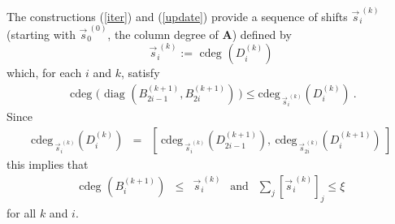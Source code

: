\documentclass[a4paper,11pt]{article}
\begin{document}
The constructions (\ref{iter}) and (\ref{update}) provide a sequence of shifts $\vec{s}_i^{~(k)}$ (starting with $\vec{s}_0^{~(0)}$, 
the column degree of $\mathbf{A}$) defined by 
$$
\vec{s}_i^{~(k)} := \mbox{ cdeg } ( D_i^{(k)} )
$$
which, for each $i$ and $k$, satisfy
\begin{eqnarray}
\mbox{ cdeg ( diag } ( B_{2i-1}^{(k+1)}, B_{2i}^{(k+1)} ) ~ )  \leq \mbox{cdeg}_{ ~ \vec{s}_i^{~(k)}} ( D_i^{(k)} ) ~. \nonumber
\end{eqnarray}
Since 
\begin{eqnarray}
\mbox{cdeg}_{ ~ \vec{s}_i^{~(k)}} ( D_i^{(k)} )
& = &  [ ~ \mbox{cdeg}_{ ~ \vec{s}_i^{~(k)}} ( D_{2i-1}^{(k+1)} ), ~\mbox{cdeg}_{ ~ \vec{s}_{2i}^{~(k)}} ( D_i^{(k+1)} ) ~] \nonumber
\end{eqnarray}
 this implies that 
\begin{eqnarray}
\mbox{ cdeg } ( B_i^{(k+1)} ) & \leq&  \vec{s}_i^{~(k)} ~~ \mbox{ and } ~~ \sum_j [ \vec{s}_i^{~(k)} ]_j \leq \xi ~ \nonumber
\end{eqnarray}
for all $k$ and $i$.
 
\end{document}
